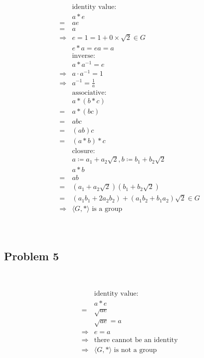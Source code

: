 \documentclass{article}
\begin{document}
\begin{equation*}
    \begin{split}
        &\text{identity value}:\\
        &a*e\\
        =&ae\\
        =&a\\
        \Rightarrow&e=1=1+0\times \sqrt{2}\in G\\
        &e*a=ea=a\\
        &\text{inverse}:\\
        &a*a^{-1}=e\\
        \Rightarrow&a\cdot a^{-1}=1\\
        \Rightarrow&a^{-1}=\frac{1}{a}\\
        &\text{associative}:\\
        &a*(b*c)\\
        =&a*(bc)\\
        =&abc\\
        =&(ab)c\\
        =&(a*b)*c\\
        &\text{closure}:\\
        &a\coloneqq a_1+a_2\sqrt{2},b\coloneqq b_1+b_2\sqrt{2}\\
        &a*b\\
        =&ab\\
        =&(a_1+a_2\sqrt{2})(b_1+b_2\sqrt{2})\\
        =&(a_1b_1+2a_2b_2)+(a_1b_2+b_1a_2)\sqrt{2}\in G\\
        \Rightarrow&\langle G,*\rangle\text{ is a group}\\
    \end{split}
\end{equation*}

~

\subsection*{Problem 5}

~

\begin{equation*}
    \begin{split}
        &\text{identity value}:\\
        &a*e\\
        =&\sqrt{ae}\\
        &\sqrt{ae}=a\\
        \Rightarrow&e=a\\
        \Rightarrow&\text{there cannot be an identity}\\
        \Rightarrow&\langle G,*\rangle\text{ is not a group}\\
    \end{split}
\end{equation*}
\end{document}
